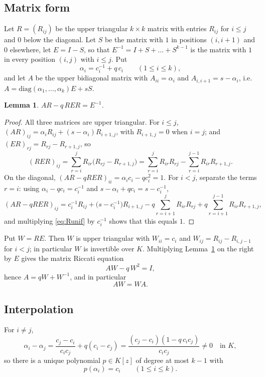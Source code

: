 \documentclass[11pt]{amsart}
\newtheorem{lemma}[theorem]{Lemma}
\theoremstyle{definition}
\begin{document}
\subsection{Matrix form}
Let $R=(R_{ij})$ be the upper triangular $k\times k$ matrix with entries $R_{ij}$ for $i\le j$ and $0$ below the diagonal. Let $S$ be the matrix with $1$ in positions $(i,i+1)$ and $0$ elsewhere, let $E=I-S$, so that $E^{-1}=I+S+\dots+S^{k-1}$ is the matrix with $1$ in every position $(i,j)$ with $i\le j$. Put
\[
\alpha_i=c_i^{-1}+q\,c_i\qquad(1\le i\le k),
\]
and let $A$ be the upper bidiagonal matrix with $A_{ii}=\alpha_i$ and $A_{i,i+1}=s-\alpha_i$, i.e.\ $A=\mathrm{diag}(\alpha_1,\dots,\alpha_k)E+sS$.

\begin{lemma}\label{lem:matrix}
$AR-q\,RER=E^{-1}$.
\end{lemma}

\begin{proof}
All three matrices are upper triangular. For $i\le j$, $(AR)_{ij}=\alpha_iR_{ij}+(s-\alpha_i)R_{i+1,j}$, with $R_{i+1,j}=0$ when $i=j$; and $(ER)_{rj}=R_{rj}-R_{r+1,j}$, so
\[
(RER)_{ij}=\sum_{r=i}^{j}R_{ir}\bigl(R_{rj}-R_{r+1,j}\bigr)=\sum_{r=i}^{j}R_{ir}R_{rj}-\sum_{r=i}^{j-1}R_{ir}R_{r+1,j}.
\]
On the diagonal, $(AR-qRER)_{ii}=\alpha_ic_i-qc_i^2=1$. For $i<j$, separate the terms $r=i$: using $\alpha_i-qc_i=c_i^{-1}$ and $s-\alpha_i+qc_i=s-c_i^{-1}$,
\[
(AR-qRER)_{ij}=c_i^{-1}R_{ij}+\bigl(s-c_i^{-1}\bigr)R_{i+1,j}-q\sum_{r=i+1}^{j}R_{ir}R_{rj}+q\sum_{r=i+1}^{j-1}R_{ir}R_{r+1,j},
\]
and multiplying \eqref{eq:Runif} by $c_i^{-1}$ shows that this equals $1$.
\end{proof}

Put $W=RE$. Then $W$ is upper triangular with $W_{ii}=c_i$ and $W_{ij}=R_{ij}-R_{i,j-1}$ for $i<j$; in particular $W$ is invertible over $K$. Multiplying Lemma~\ref{lem:matrix} on the right by $E$ gives the matrix Riccati equation
\begin{equation}\label{eq:riccati}
AW-q\,W^2=I,
\end{equation}
hence $A=qW+W^{-1}$, and in particular
\begin{equation}\label{eq:commute}
AW=WA.
\end{equation}

\subsection{Interpolation}
For $i\ne j$,
\begin{equation}\label{eq:alphadiff}
\alpha_i-\alpha_j=\frac{c_j-c_i}{c_ic_j}+q(c_i-c_j)=\frac{(c_j-c_i)(1-q\,c_ic_j)}{c_ic_j}\neq0\quad\text{in }K,
\end{equation}
so there is a unique polynomial $p\in K[z]$ of degree at most $k-1$ with
\begin{equation}\label{eq:interp}
p(\alpha_i)=c_i\qquad(1\le i\le k).
\end{equation}
\end{document}
